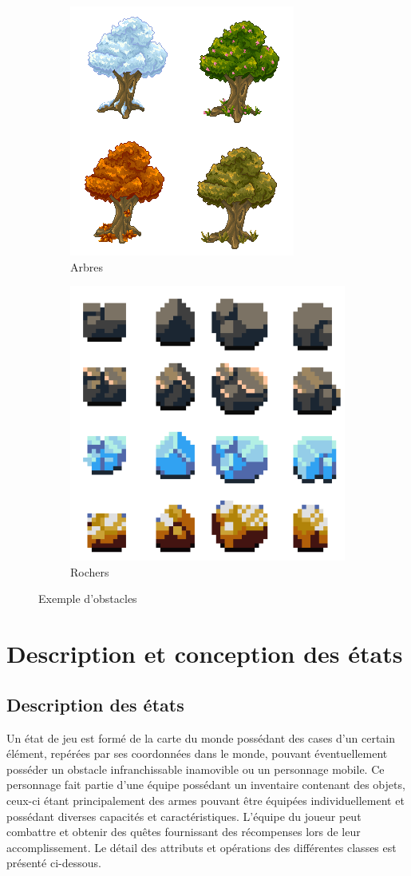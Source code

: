 \documentclass[a4paper,12pt]{article}
\begin{document}
   \begin{figure} [ht]
            \centering
            \begin{subfigure}
                \centering
                \includegraphics[width=.4\linewidth]{trees.png}
                \caption{Arbres}
            \end{subfigure}%
            \begin{subfigure}
                \centering
                \includegraphics[width=.4\linewidth]{rocks.png}
                \caption{Rochers}
            \end{subfigure}
            \caption{Exemple d'obstacles}
        \end{figure}

\clearpage
\section{Description et conception des états}

\subsection{Description des états}
Un état de jeu est formé de la carte du monde possédant des cases d'un certain élément, repérées par ses coordonnées dans le monde, pouvant éventuellement posséder un obstacle infranchissable inamovible ou un personnage mobile. Ce personnage fait partie d'une équipe possédant un inventaire contenant des objets, ceux-ci étant principalement des armes pouvant être équipées individuellement et possédant diverses capacités et caractéristiques. L'équipe du joueur peut combattre et obtenir des quêtes fournissant des récompenses lors de leur accomplissement.
Le détail des attributs et opérations des différentes classes est présenté ci-dessous.
\end{document}
